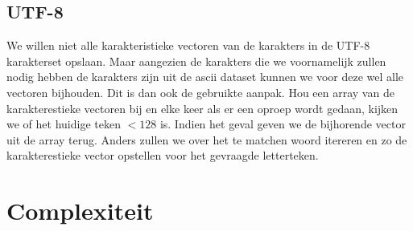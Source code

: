 \documentclass[11pt]{article}
\begin{document}
\subsection{UTF-8}
We willen niet alle karakteristieke vectoren van de karakters in de UTF-8 karakterset opslaan. Maar aangezien de karakters die we voornamelijk zullen nodig hebben de karakters zijn uit de ascii dataset kunnen we voor deze wel alle vectoren bijhouden. Dit is dan ook de gebruikte aanpak. Hou een array van de karakterestieke vectoren bij en elke keer als er een oproep wordt gedaan, kijken we of het huidige teken $< 128$ is. Indien het geval geven we de bijhorende vector uit de array terug. Anders zullen we over het te matchen woord itereren en zo de karakterestieke vector opstellen voor het gevraagde letterteken.

\section{Complexiteit}
\end{document}
